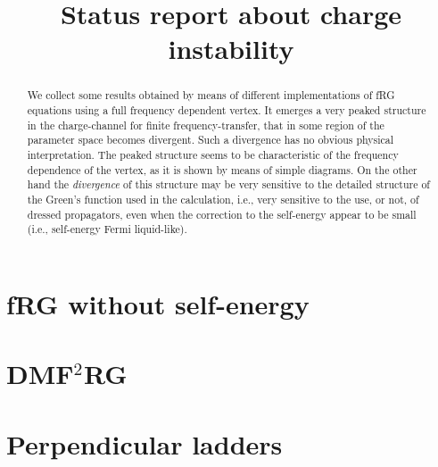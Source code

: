 \documentclass[a4paper,11pt]{article}
\begin{document}
\title{Status report about charge instability}

\maketitle 







\begin{abstract}

We collect some results obtained by means of different implementations of fRG equations using a full frequency dependent vertex. 
It emerges a very peaked structure in the charge-channel for finite frequency-transfer, that in some region of the parameter space becomes divergent. Such a divergence has no obvious physical interpretation.  
The peaked structure seems to be characteristic of the frequency dependence of the vertex, as it is shown by means of simple diagrams. 
On the other hand the \emph{divergence} of this structure may be very sensitive to the detailed structure of the Green's function used in the calculation, i.e., very sensitive to the use, or not, of dressed propagators, even when the correction to the self-energy appear to be small (i.e., self-energy Fermi liquid-like).  

\end{abstract}

\maketitle

\section{fRG without self-energy} 				
\label{sec:frgnoself}
  

\section{DMF$^2$RG }	
\label{sec:dmf2rgnoself}


\section{Perpendicular ladders}				
\label{sec:perpendciular}



  
\end{document}
